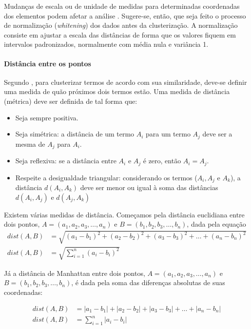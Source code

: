 Mudanças de escala ou de unidade de medidas para determinadas coordenadas dos elementos podem afetar a análise \cite{cole1998}. Sugere-se, então, que seja feito o processo de normalização (\textit{whitening}) dos dados antes da clusterização. A normalização consiste em ajustar a escala das distâncias de forma que os valores fiquem em intervalos padronizados, normalmente com média nula e variância 1.


\paragraph{Distância entre os pontos}
\label{ssub:distância_entre_os_pontos}

Segundo , para clusterizar termos de acordo com sua similaridade, deve-se definir uma medida de quão próximos dois termos estão. Uma medida de distância (métrica) deve ser definida de tal forma que:

\begin{itemize}
  \item Seja sempre positiva.
  \item Seja simétrica: a distância de um termo \(A_{i}\) para um termo \(A_{j}\) deve ser a mesma de \(A_{j}\) para \(A_{i}\).
  \item Seja reflexiva: se a distância entre \(A_{i}\) e \(A_{j}\) é zero, então \(A_{i} = A_{j}\).
  \item Respeite a desigualdade triangular: considerando os termos (\(A_{i}, A_{j}\) e \(A_k\)), a distância \(d(A_{i}, A_k)\) deve ser menor ou igual à soma das distâncias \(d(A_{i}, A_{j})\) e \(d(A_{j}, A_k)\)
\end{itemize}

Existem várias medidas de distância. Começamos pela distância euclidiana entre dois pontos, \(A=(a_1, a_2, a_3, \ldots, a_n) \) e \(B=(b_1, b_2, b_3, \ldots, b_n) \), dada pela equação
%
\begin{align}
  dist(A, B) &= \sqrt{(a_1-b_1)^2+(a_2-b_2)^2+(a_3-b_3)^2+\ldots+(a_n-b_n)^2} \\
  dist(A, B) &= \sqrt{\displaystyle\sum_{i=1}^{n} (a_i-b_i)^2} \label{eq:euclidean}
\end{align}

Já a distância de Manhattan entre dois pontos, \(A=(a_1, a_2, a_3, \ldots, a_n) \) e \(B=(b_1, b_2, b_3, \ldots, b_n) \), é dada pela soma das diferenças absolutas de suas coordenadas:

\begin{align}
  dist(A, B) &= |a_1-b_1|+|a_2-b_2|+|a_3-b_3|+\ldots+|a_n-b_n| \\
  dist(A, B) &= \displaystyle\sum_{i=1}^{n} |a_i-b_i| \label{eq:manhattan}
\end{align}

